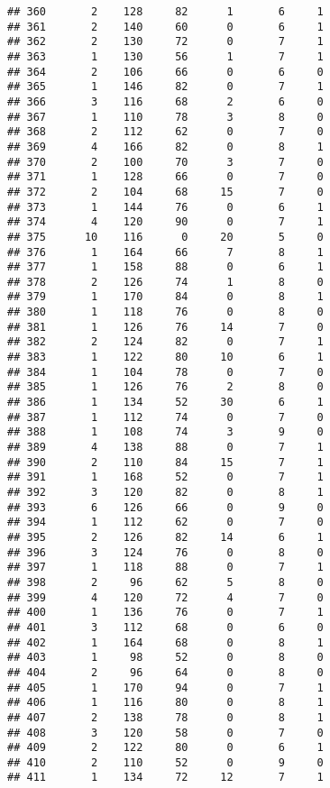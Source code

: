 \documentclass[
]{article}
\begin{document}
\begin{verbatim}
## 360       2    128     82      1       6     1
## 361       2    140     60      0       6     1
## 362       2    130     72      0       7     1
## 363       1    130     56      1       7     1
## 364       2    106     66      0       6     0
## 365       1    146     82      0       7     1
## 366       3    116     68      2       6     0
## 367       1    110     78      3       8     0
## 368       2    112     62      0       7     0
## 369       4    166     82      0       8     1
## 370       2    100     70      3       7     0
## 371       1    128     66      0       7     0
## 372       2    104     68     15       7     0
## 373       1    144     76      0       6     1
## 374       4    120     90      0       7     1
## 375      10    116      0     20       5     0
## 376       1    164     66      7       8     1
## 377       1    158     88      0       6     1
## 378       2    126     74      1       8     0
## 379       1    170     84      0       8     1
## 380       1    118     76      0       8     0
## 381       1    126     76     14       7     0
## 382       2    124     82      0       7     1
## 383       1    122     80     10       6     1
## 384       1    104     78      0       7     0
## 385       1    126     76      2       8     0
## 386       1    134     52     30       6     1
## 387       1    112     74      0       7     0
## 388       1    108     74      3       9     0
## 389       4    138     88      0       7     1
## 390       2    110     84     15       7     1
## 391       1    168     52      0       7     1
## 392       3    120     82      0       8     1
## 393       6    126     66      0       9     0
## 394       1    112     62      0       7     0
## 395       2    126     82     14       6     1
## 396       3    124     76      0       8     0
## 397       1    118     88      0       7     1
## 398       2     96     62      5       8     0
## 399       4    120     72      4       7     0
## 400       1    136     76      0       7     1
## 401       3    112     68      0       6     0
## 402       1    164     68      0       8     1
## 403       1     98     52      0       8     0
## 404       2     96     64      0       8     0
## 405       1    170     94      0       7     1
## 406       1    116     80      0       8     1
## 407       2    138     78      0       8     1
## 408       3    120     58      0       7     0
## 409       2    122     80      0       6     1
## 410       2    110     52      0       9     0
## 411       1    134     72     12       7     1

\end{verbatim}
\end{document}

